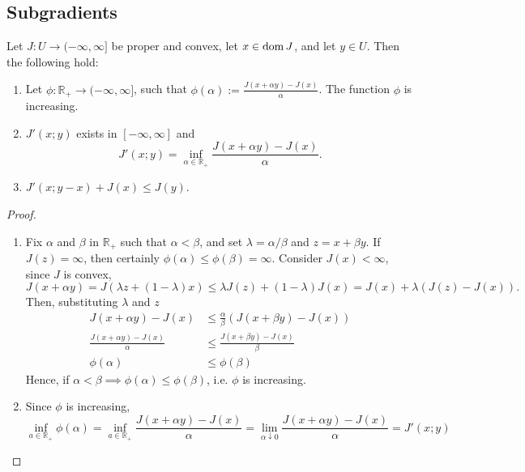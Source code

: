 \subsection{Subgradients}

\begin{proposition}
\label{prop5. ConvexProperties}
 Let $J : U \rightarrow (-\infty, \infty]$ be proper and convex, let $x \in 
 \mathrm{dom\,} J$, and let $y \in U$. Then the following hold:
 \begin{enumerate}
 	\item Let $\phi:\mathbb{R}_+\rightarrow (-\infty, \infty]$, such that $\phi(\alpha) := \frac{J(x+\alpha y) -J(x)}{\alpha}$. The function $\phi$ is increasing.
 	\item $J'(x;y)$ exists in $[-\infty, \infty]$ and  \[J'(x;y)=\inf_{\alpha \in \mathbb{R}_+} \frac{J(x+\alpha y)-J(x)}{\alpha}.\]
 	\item $J'(x; y-x)+J(x)\leq J(y)$.
 \end{enumerate}
 
 \begin{proof} \
 	\begin{enumerate}
	\item Fix $\alpha$ and $\beta$ in $\mathbb{R}_+$ such that $\alpha < \beta$, and set $\lambda =\alpha/\beta$ and $z=x+\beta y$. If $J(z)=\infty$, then certainly $\phi(\alpha) \leq \phi(\beta) = \infty$. Consider $J(x)<\infty$, since $J$ is convex,
	 \[J (x + \alpha y) = J(\lambda z + (1 - \lambda)x) \leq \lambda J(z) + (1 - \lambda)J(x) = J(x) + \lambda(J(z)- J(x)).\]
	 Then, substituting $\lambda$ and $z$ 
	 \begin{align*}
			 J (x + \alpha y) - J(x) &\leq \frac{\alpha}{\beta} (J(x+\beta y)-J(x))\\
			 \frac{J (x + \alpha y) - J(x)}{\alpha} &\leq \frac{J(x+\beta y)-J(x)}{\beta}\\
			 \phi(\alpha)&\leq\phi(\beta)
	 \end{align*}
	 Hence, if $\alpha < \beta \implies \phi(\alpha) \leq \phi(\beta)$, i.e. $\phi$ is increasing.
	 \item Since $\phi$ is increasing, 
	 \[
		\inf_{a\in\mathbb{R}_+} \phi({\alpha}) = \inf_{a\in\mathbb{R}_+} \frac{J (x + \alpha y) - J(x)}{\alpha} =\lim\limits_{\alpha \downarrow 0} \frac{J (x + \alpha y) - J(x)}{\alpha} = J'(x; y)
	 \]
	 

\end{enumerate}
\end{proof}
\end{proposition}
